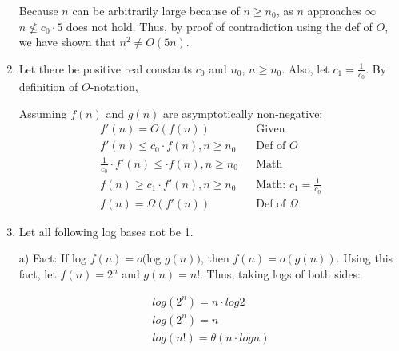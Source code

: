 \documentclass[a4paper]{report}
\begin{document}
\begin{enumerate}
    Because $n$ can be arbitrarily large because of $n \geq n_{0}$, as $n$ approaches $\infty$ $n \nleq c_{0} \cdot 5$ does not hold. 
  Thus, by proof of contradiction using the def of $O$, we have shown that $n^2 \neq O(5n)$.

    \par
    \bigskip
    \setcounter{equation}{0}
    
    \item Let there be positive real constants $c_{0}$ and $n_{0}$, $n \geq n_{0}$. Also, let $c_{1} = \frac{1}{c_{0}}$. By definition of $O$-notation, 

    Assuming $f(n)$ and $g(n)$ are asymptotically non-negative: 
    \begin{align}
      f'(n) = O(f(n))                                   &&\text{Given }\\
      f'(n) \leq c_{0} \cdot f(n), n \geq n_{0}          &&\text{Def of $O$}\\
      \frac{1}{c_{0}} \cdot f'(n) \leq \cdot f(n), n \geq n_{0}          &&\text{Math}\\
      f(n) \geq c_{1} \cdot f'(n), n \geq n_{0}          &&\text{Math: $c_{1} = \frac{1}{c_{0}}$}\\
      f(n)  = \Omega(f'(n))                               &&\text{Def of $\Omega$}
    \end{align}

    
    \pagebreak
    \bigskip
    \setcounter{equation}{0}

    \item 

      Let all following log bases not be 1. 

      a) Fact: If log $f(n) = o($log $g(n))$, then $f(n) = o(g(n))$. 
      Using this fact, let $f(n) = 2^n$ and $g(n) = n!$. Thus, taking logs of both sides:

      \begin{align}
        log(2^n) = n \cdot log 2 \\
        log(2^n) = n \\
        log(n!) = \theta(n \cdot log n) \\
      \end{align}


\end{enumerate}
\end{document}
